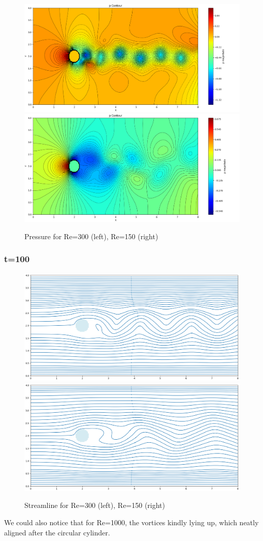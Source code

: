 \documentclass[12pt]{article}
\begin{document}
\begin{figure}[H]
    \centering
    \includegraphics[width=0.45\linewidth]{figure/N32_Re1000_8x4_t50/p_N32_Re1000_8x4_t50.jpg}
    \includegraphics[width=0.45\linewidth]{figure/N32_Re150_8x4_t50/p_N32_Re150_8x4_t50.jpg}
    \caption{Pressure for Re=300 (left), Re=150 (right)}
\end{figure}


\subsubsection{t=100}
\begin{figure}[H]
    \centering
    \includegraphics[width=0.45\linewidth]{figure/N32_Re1000_8x4_t100/stline_N32_Re1000_8x4_t100.jpg}
    \includegraphics[width=0.45\linewidth]{figure/N32_Re150_8x4_t100/stline_N32_Re150_8x4_t100.jpg}
    \caption{Streamline for Re=300 (left), Re=150 (right) }
\end{figure}

We could also notice that for Re=1000, the vortices kindly lying up, which neatly aligned after the circular cylinder.
\end{document}

